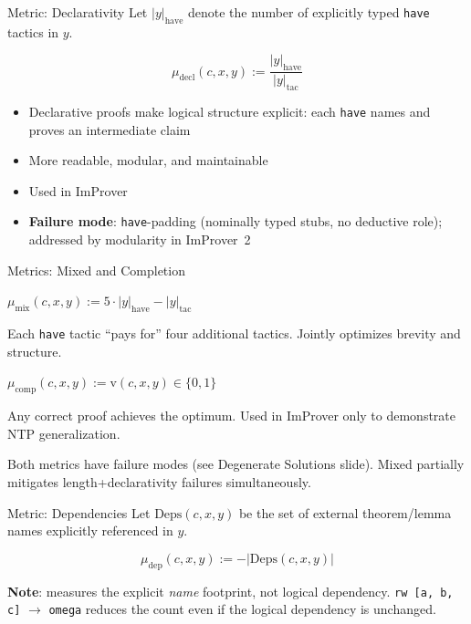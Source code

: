 \documentclass{beamer}
\newcommand{\bad}[1]{\textcolor{improverRed}{\textbf{#1}}}
\begin{document}
\begin{frame}{Metric: Declarativity}
\vspace{0.4em}
Let $|y|_{\mathrm{have}}$ denote the number of explicitly typed \texttt{have} tactics in $y$.
\vspace{0.3em}
\begin{definition}
\[
  \mu_{\mathrm{decl}}(c,x,y) := \frac{|y|_{\mathrm{have}}}{|y|_{\mathrm{tac}}}
\]
\end{definition}
\vspace{0.4em}
\begin{itemize}\setlength{\itemsep}{6pt}
  \item Declarative proofs make logical structure explicit: each \texttt{have} names and proves an intermediate claim
  \item More readable, modular, and maintainable
  \item Used in ImProver
  \item \bad{Failure mode}: \texttt{have}-padding (nominally typed stubs, no deductive role); addressed by modularity in ImProver~2
\end{itemize}
\end{frame}

\begin{frame}{Metrics: Mixed and Completion}
\vspace{0.4em}
\begin{definition}
$\mu_{\mathrm{mix}}(c,x,y) := 5\cdot|y|_{\mathrm{have}} - |y|_{\mathrm{tac}}$
\end{definition}
\small Each \texttt{have} tactic ``pays for'' four additional tactics. Jointly optimizes brevity and structure.
\vspace{0.4em}
\begin{definition}
$\mu_{\mathrm{comp}}(c,x,y) := \mathrm{v}(c,x,y) \in \{0,1\}$
\end{definition}
\small Any correct proof achieves the optimum. Used in ImProver only to demonstrate NTP generalization.
\vspace{0.4em}
\begin{alertblock}{}
  \small Both metrics have failure modes (see Degenerate Solutions slide). Mixed partially mitigates length+declarativity failures simultaneously.
\end{alertblock}
\end{frame}

\begin{frame}{Metric: Dependencies}
\vspace{0.4em}
Let $\mathrm{Deps}(c,x,y)$ be the set of external theorem/lemma names explicitly referenced in $y$.
\vspace{0.4em}
\begin{definition}
\[
  \mu_{\mathrm{dep}}(c, x, y) := -\left|\mathrm{Deps}(c, x, y)\right|
\]
\end{definition}
\vspace{0.6em}
\small \textbf{Note}: measures the explicit \emph{name} footprint, not logical dependency. \texttt{rw [a, b, c]} $\to$ \texttt{omega} reduces the count even if the logical dependency is unchanged.
\end{frame}
\end{document}
